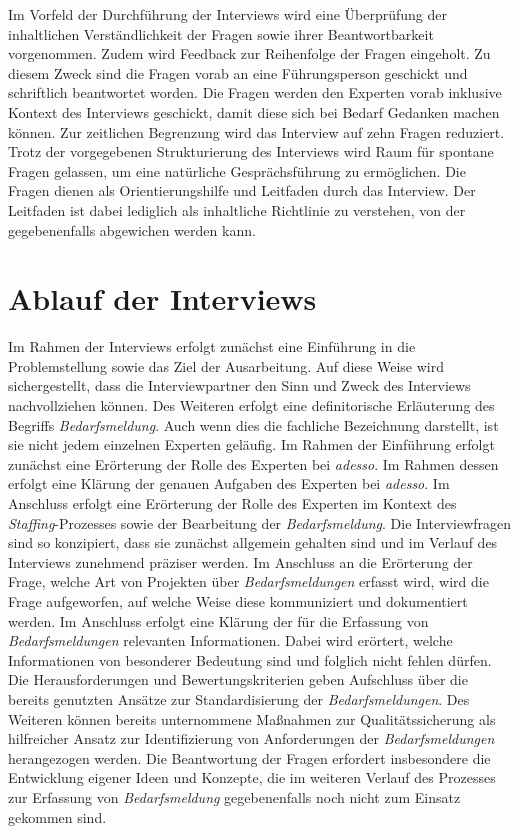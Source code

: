 Im Vorfeld der Durchführung der Interviews wird eine Überprüfung der inhaltlichen Verständlichkeit der Fragen sowie ihrer Beantwortbarkeit vorgenommen. Zudem wird Feedback zur Reihenfolge der Fragen eingeholt. Zu diesem Zweck sind die Fragen vorab an eine Führungsperson geschickt und schriftlich beantwortet worden. Die Fragen werden den Experten vorab inklusive Kontext des Interviews geschickt, damit diese sich bei Bedarf Gedanken machen können. Zur zeitlichen Begrenzung wird das Interview auf zehn Fragen reduziert. Trotz der vorgegebenen Strukturierung des Interviews wird Raum für spontane Fragen gelassen, um eine natürliche Gesprächsführung zu ermöglichen. Die Fragen dienen als Orientierungshilfe und Leitfaden durch das Interview. Der Leitfaden ist dabei lediglich als inhaltliche Richtlinie zu verstehen, von der gegebenenfalls abgewichen werden kann.
\section{Ablauf der Interviews}
\label{sec:ablaufexperteninterviews}
Im Rahmen der Interviews erfolgt zunächst eine Einführung in die Problemstellung sowie das Ziel der Ausarbeitung. Auf diese Weise wird sichergestellt, dass die Interviewpartner den Sinn und Zweck des Interviews nachvollziehen können. Des Weiteren erfolgt eine definitorische Erläuterung des Begriffs \emph{Bedarfsmeldung}. Auch wenn dies die fachliche Bezeichnung darstellt, ist sie nicht jedem einzelnen Experten geläufig. Im Rahmen der Einführung erfolgt zunächst eine Erörterung der Rolle des Experten bei \emph{adesso}. Im Rahmen dessen erfolgt eine Klärung der genauen Aufgaben des Experten bei \emph{adesso}. Im Anschluss erfolgt eine Erörterung der Rolle des Experten im Kontext des \emph{Staffing}-Prozesses sowie der Bearbeitung der \emph{Bedarfsmeldung}. Die Interviewfragen sind so konzipiert, dass sie zunächst allgemein gehalten sind und im Verlauf des Interviews zunehmend präziser werden. Im Anschluss an die Erörterung der Frage, welche Art von Projekten über \emph{Bedarfsmeldungen} erfasst wird, wird die Frage aufgeworfen, auf welche Weise diese kommuniziert und dokumentiert werden. Im Anschluss erfolgt eine Klärung der für die Erfassung von \emph{Bedarfsmeldungen} relevanten Informationen. Dabei wird erörtert, welche Informationen von besonderer Bedeutung sind und folglich nicht fehlen dürfen. Die Herausforderungen und Bewertungskriterien geben Aufschluss über die bereits genutzten Ansätze zur Standardisierung der \emph{Bedarfsmeldungen}. Des Weiteren können bereits unternommene Maßnahmen zur Qualitätssicherung als hilfreicher Ansatz zur Identifizierung von Anforderungen der \emph{Bedarfsmeldungen} herangezogen werden. Die Beantwortung der Fragen erfordert insbesondere die Entwicklung eigener Ideen und Konzepte, die im weiteren Verlauf des Prozesses zur Erfassung von \emph{Bedarfsmeldung} gegebenenfalls noch nicht zum Einsatz gekommen sind.
